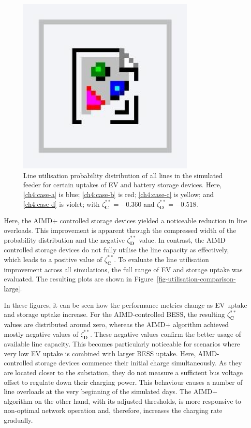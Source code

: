 \begin{figure}\centering
 \includegraphics[width=0.8\textwidth]{foo}
 \caption{Line utilisation probability distribution of all lines in the simulated feeder for certain uptakes of EV and battery storage devices. Here, \ref{ch4:case-a} is blue; \ref{ch4:case-b} is red; \ref{ch4:case-c} is yellow; and \ref{ch4:case-d} is violet; with $\zeta_\textbf{C}^{**} = -0.360$ and $\zeta_\textbf{D}^{**} = -0.518$.}
 \label{fig-line-utilisation-excerpt}
\end{figure}

Here, the AIMD+ controlled storage devices yielded a noticeable reduction in line overloads. This improvement is apparent through the compressed width of the probability distribution and the negative $\zeta_\textbf{D}^{**}$ value. In contrast, the AIMD controlled storage devices do not fully utilise the line capacity as effectively, which leads to a positive value of $\zeta_\textbf{C}^{**}$. To evaluate the line utilisation improvement across all simulations, the full range of EV and storage uptake was evaluated. The resulting plots are shown in Figure~\ref{fig-utilisation-comparison-large}.

In these figures, it can be seen how the performance metrics change as EV uptake and storage uptake increase. For the AIMD-controlled BESS, the resulting $\zeta_\textbf{C}^{**}$ values are distributed around zero, whereas the AIMD+ algorithm achieved mostly negative values of $\zeta_\textbf{D}^{**}$. These negative values confirm the better usage of available line capacity. This becomes particularly noticeable for scenarios where very low EV uptake is combined with larger BESS uptake. Here, AIMD-controlled storage devices commence their initial charge simultaneously. As they are located closer to the substation, they do not measure a sufficient bus voltage offset to regulate down their charging power. This behaviour causes a number of line overloads at the very beginning of the simulated days. The AIMD+ algorithm on the other hand, with its adjusted thresholds, is more responsive to non-optimal network operation and, therefore, increases the charging rate gradually.

